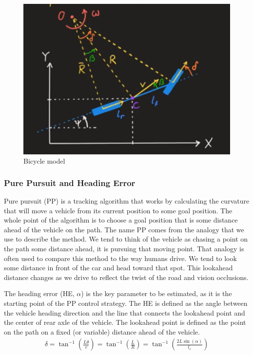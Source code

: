 \documentclass[a4paper,12pt,sort&compress]{article}
\begin{document}
    \begin{figure}
        \centering
        \includegraphics[width=0.8\linewidth]{bicycle_model.png}
        \caption{Bicycle model}
        \label{fig:bicycle_model}
    \end{figure}

    \subsubsection*{Pure Pursuit and Heading Error}
    Pure pursuit (PP) is a tracking algorithm that works by calculating the curvature that will move a vehicle
    from its current position to some goal position. The whole point of the algorithm is to choose a goal
    position that is some distance ahead of the vehicle on the path. The name PP comes from
    the analogy that we use to describe the method. We tend to think of the vehicle as chasing a point
    on the path some distance ahead, it is pursuing that moving point. That analogy is often used
    to compare this method to the way humans drive. We tend to look some distance in front of the car
    and head toward that spot. This lookahead distance changes as we drive to reflect the twist of the
    road and vision occlusions\cite{coulter1992implementation}.

    The heading error (HE, $\alpha$) is the key parameter to be estimated, as it is the
    starting point of the PP control strategy\citep{7796574,9368694}.
    The HE is defined as the angle between the vehicle heading direction and the
    line that connects the lookahead point and the center of rear axle of the
    vehicle. The lookahead point is defined as the point on the path on a fixed (or
    variable) distance ahead of the vehicle. 
    \begin{align}
        \delta=\tan^{-1}\left(\frac{L\dot{\theta}}{v}\right)=\tan^{-1}\left(\frac{L}{R}\right)=\tan^{-1}\left(\frac{2L\sin\left(\alpha\right)}{l_{c}}\right)
    \end{align}
\end{document}
